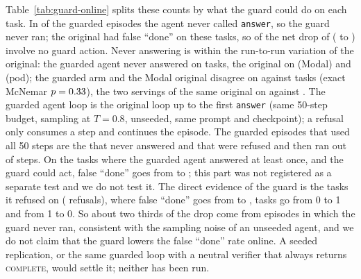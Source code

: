 Table~\ref{tab:guard-online} splits these counts by what the guard could do on each task. In \ogDecNoAnsN{} of the \OgN{} guarded episodes the agent never called \texttt{answer}, so the guard never ran; the original had \ogDecNoAnsFdb{} false ``done'' on these tasks, so \ogDecNoAnsFdb{} of the net drop of \ogFdNetDrop{} (\ogFdBaseN{} to \ogFdGuardN) involve no guard action. Never answering is within the run-to-run variation of the original: the guarded agent never answered on \ogDecNoAnsN{} tasks, the original on \ogNoAnsModal{} (Modal) and \ogNoAnsPod{} (pod); the guarded arm and the Modal original disagree on \ogNoAnsOnlyGuard{} against \ogNoAnsOnlyModal{} tasks (exact McNemar $p=0.33$), the two servings of the same original on \ogNoAnsOnlyPod{} against \ogNoAnsOnlyModalPod. The guarded agent loop is the original loop up to the first \texttt{answer} (same 50-step budget, sampling at $T=0.8$, unseeded, same prompt and checkpoint); a refusal only consumes a step and continues the episode. The \ogDecAllCapg{} guarded episodes that used all 50 steps are the \ogDecNoAnsN{} that never answered and \ogCapRefused{} that were refused and then ran out of steps. On the \ogDecAnsN{} tasks where the guarded agent answered at least once, and the guard could act, false ``done'' goes from \ogDecAnsFdb{} to \ogDecAnsFdg; this part was not registered as a separate test and we do not test it. The direct evidence of the guard is the \ogDecRefN{} tasks it refused on (\ogDecRefRef{} refusals), where false ``done'' goes from \ogDecRefFdb{} to \ogDecRefFdg{}, \ogDecRefB{} tasks go from 0 to 1 and \ogDecRefC{} from 1 to 0. So about two thirds of the drop come from episodes in which the guard never ran, consistent with the sampling noise of an unseeded agent, and we do not claim that the guard lowers the false ``done'' rate online. A seeded replication, or the same guarded loop with a neutral verifier that always returns \textsc{complete}, would settle it; neither has been run.

